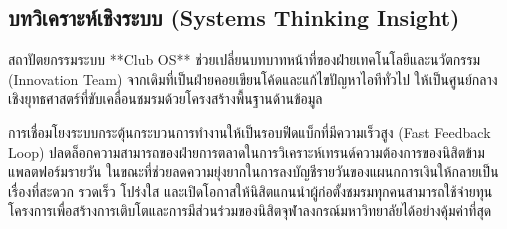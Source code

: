 \documentclass[10pt,a4paper]{article}
\begin{document}
\subsection{บทวิเคราะห์เชิงระบบ (Systems Thinking Insight)}
สถาปัตยกรรมระบบ **Club OS** ช่วยเปลี่ยนบทบาทหน้าที่ของฝ่ายเทคโนโลยีและนวัตกรรม (Innovation Team) จากเดิมที่เป็นฝ่ายคอยเขียนโค้ดและแก้ไขปัญหาไอทีทั่วไป ให้เป็นศูนย์กลางเชิงยุทธศาสตร์ที่ขับเคลื่อนชมรมด้วยโครงสร้างพื้นฐานด้านข้อมูล 

การเชื่อมโยงระบบกระตุ้นกระบวนการทำงานให้เป็นรอบฟีดแบ็กที่มีความเร็วสูง (Fast Feedback Loop) ปลดล็อกความสามารถของฝ่ายการตลาดในการวิเคราะห์เทรนด์ความต้องการของนิสิตข้ามแพลตฟอร์มรายวัน ในขณะที่ช่วยลดความยุ่งยากในการลงบัญชีรายวันของแผนกการเงินให้กลายเป็นเรื่องที่สะดวก รวดเร็ว โปร่งใส และเปิดโอกาสให้นิสิตแกนนำผู้ก่อตั้งชมรมทุกคนสามารถใช้จ่ายทุนโครงการเพื่อสร้างการเติบโตและการมีส่วนร่วมของนิสิตจุฬาลงกรณ์มหาวิทยาลัยได้อย่างคุ้มค่าที่สุด
\end{document}
